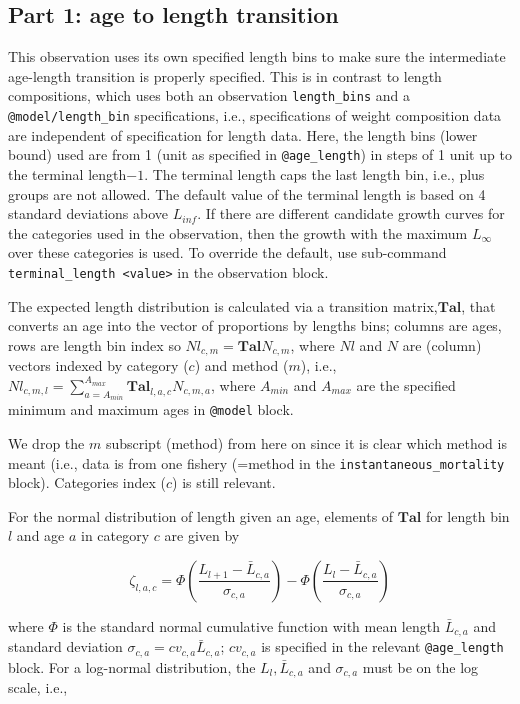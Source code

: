 \documentclass[a4paper,11pt,twoside,pdftex,draft]{article}
\begin{document}
\subsection{Part 1: age to length transition}

This observation uses its own specified length bins to make sure  the intermediate age-length transition is properly specified. This is in contrast to length compositions, which uses both an observation \texttt{length\_bins} and a  \texttt{@model/length\_bin}  specifications, i.e., specifications of weight composition data are independent of specification for length data. Here, the length bins (lower bound)  used are from 1 (unit as specified in \texttt{@age\_length}) in steps of 1 unit up to the terminal length$ - 1$. 
  The terminal length caps the last length bin, i.e., plus groups are not allowed. The default value of the terminal length is based on  4 standard deviations above $L_{inf}$. If there are different candidate growth curves for the categories used in the observation, then the growth with the  maximum $L_{\infty}$ over these categories is used. To override the default, use sub-command \texttt{terminal\_length  <value>} in the observation block.


The expected length distribution is calculated via 
a transition matrix,$\mathbf{Tal}$, that converts an age into the vector of proportions by lengths bins; columns are ages, rows are length bin index so $Nl_{c,m} = \mathbf{Tal} N_{c,m}$, where $Nl$ and $N$ are (column) vectors indexed by category ($c$) and method ($m$), i.e.,
$Nl_{c,m,l} = \sum_{a=A_{min}}^{A_{max}}  \mathbf{Tal}_{l,a,c} N_{c,m,a}$, where $A_{min}$ and $A_{max}$ are the specified minimum and maximum ages in \texttt{@model} block.

We drop the $m$ subscript (method) from here on since it is clear which method is meant (i.e., data is from one fishery (=method in the \texttt{instantaneous\_mortality} block). Categories index ($c$) is still relevant.

For the normal distribution of length given an age, 
elements of $\mathbf{Tal}$ for length bin $l$ and age $a$ in category $c$ are given by

\begin{equation}
\zeta_{l,a,c} = \Phi\left( \frac{L_{l+1} - \bar L_{c,a}   }{\sigma_{c,a}} \right)   - \Phi\left( \frac{L_{l} - \bar L_{c,a}   }{\sigma_{c,a}} \right)
\end{equation}

where $\Phi$ is the standard normal cumulative function with mean length $\bar L_{c,a}$ and standard deviation $\sigma_{c,a} = cv_{c,a} \bar L_{c,a}$; $cv_{c,a}$ is specified in the relevant  \texttt{@age\_length} block. For a log-normal distribution, the $L_{l}, \bar L_{c,a}$ and $\sigma_{c,a}$ must be on the log scale, i.e.,
\end{document}
